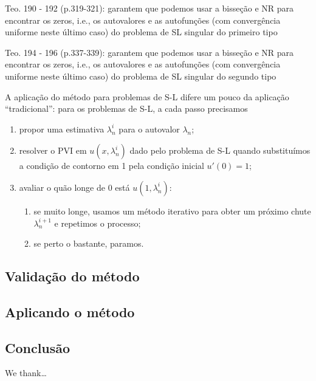 \documentclass[twocolumn,showpacs,%
  nofootinbib,aps,superscriptaddress,%
  eqsecnum,prd,notitlepage,showkeys,10pt]{revtex4-1}
\begin{document}
Teo. 190 - 192 (p.319-321):
garantem que podemos usar a bisseção e NR para encontrar os zeros, i.e.,
os autovalores e as autofunções (com convergência uniforme neste último caso) do problema de SL singular do primeiro tipo

Teo. 194 - 196 (p.337-339):
garantem que podemos usar a bisseção e NR para encontrar os zeros, i.e.,
os autovalores e as autofunções (com convergência uniforme neste último caso) do problema de SL singular do segundo tipo

A aplicação do método para problemas de S-L difere um pouco da aplicação ``tradicional'':
para os problemas de S-L, a cada passo precisamos
%
\begin{enumerate}
    \item propor uma estimativa $\lambda_n^i$ para o autovalor $\lambda_n$; 
    \item resolver o PVI em $u(x, \lambda_n^i)$ dado pelo problema de S-L quando substituímos a condição de
    contorno em 1 pela condição inicial $u'(0) = 1$;
    \item avaliar o quão longe de $0$ está $u(1,\lambda_n^i)$:
    \begin{enumerate}
        \item se muito longe, usamos um método iterativo para obter um próximo chute $\lambda_n^{i+1}$
        e repetimos o processo;
        \item se perto o bastante, paramos.
    \end{enumerate}
\end{enumerate}
%

%
\subsection{Validação do método}\label{subsec:validacao}
%



%
\subsection{Aplicando o método}\label{subsec:aplicacao}
%



%
\subsection{Conclusão}\label{subsec:conclusao}
%

% 

\begin{acknowledgments}

We thank\dots

\end{acknowledgments}

% 


\end{document}
